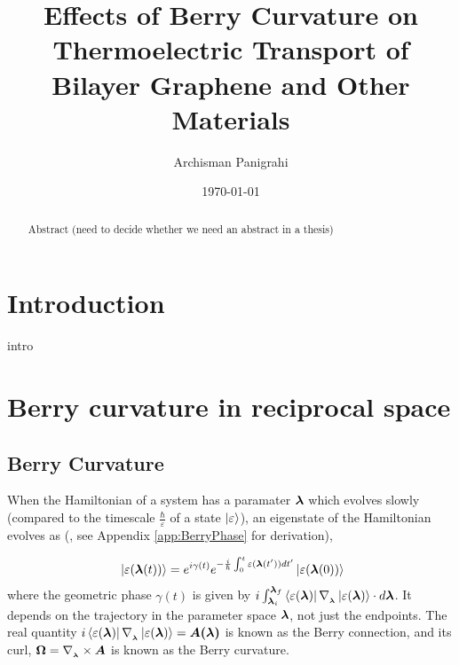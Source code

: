 \documentclass{revtex4-2}
\renewcommand\vec[1]{\ensuremath\boldsymbol{#1}} %
\begin{document}
\title{\bf Effects of Berry Curvature on Thermoelectric Transport of Bilayer Graphene and Other Materials}


\author{Archisman Panigrahi}



\date{\today}


\begin{abstract}
Abstract (need to decide whether we need an abstract in a thesis)
\end{abstract}

\maketitle
\tableofcontents



\newpage
\section{Introduction}
intro
\section{Berry curvature in reciprocal space}
\subsection{Berry Curvature}
When the Hamiltonian of a system has a paramater $\vec{\lambda}$ which evolves slowly (compared to the timescale $\frac{\hbar}{\varepsilon}$ of a state $\ket{\varepsilon}$), an eigenstate of the Hamiltonian evolves as (\cite{BerryQuantalPhase1984}, see Appendix \ref{app:BerryPhase} for derivation),

\begin{equation}~\label{Eq:BerryPhaseOriginal}
	\ket{\varepsilon(\vec{\lambda}(t))} = e^{i \gamma(t)} e^{-\frac{i}{\hbar} \int_0^t \varepsilon(\vec{\lambda}(t')) dt'} \ket{\varepsilon(\vec{\lambda}(0))}
\end{equation}
where the geometric phase $\gamma(t)$ is given by $i\int_{\vec{\lambda}_i}^{\vec{\lambda}_f} \bra{\varepsilon({\vec{\lambda}})}\nabla_{_{\vec{\lambda}}} \ket{\varepsilon({\vec{\lambda}})} \cdot d \vec{\lambda}$. It depends on the trajectory in the parameter space $\vec{\lambda}$, not just the endpoints. The real quantity $i\bra{\varepsilon({\vec{\lambda}})}\nabla_{_{\vec{\lambda}}}\ket{\varepsilon({\vec{\lambda}})} = \vec{A(\vec{\lambda})}$ is known as the Berry connection, and its curl, $\vec{\Omega} = \nabla_{_{\vec{\lambda}}} \times \vec{A}$ is known as the Berry curvature.
\end{document}
